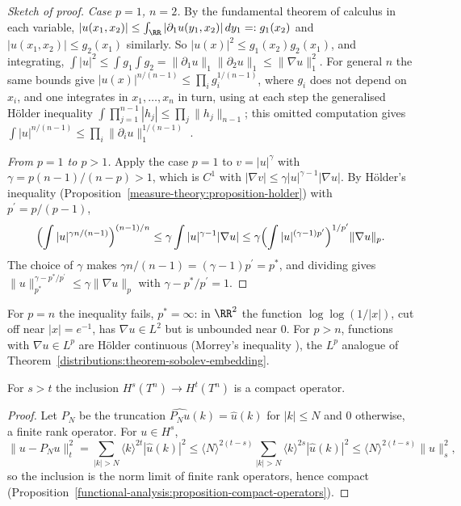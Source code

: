 \begin{proof}[Sketch of proof]
\emph{Case $p = 1$, $n = 2$.} By the fundamental theorem of calculus in each variable, $|u(x_1, x_2)| \leq \int_\RR|\partial_1u(y_1, x_2)|\,dy_1 =: g_1(x_2)$ and $|u(x_1, x_2)| \leq g_2(x_1)$ similarly. So
$|u(x)|^2 \leq g_1(x_2)g_2(x_1)$, and integrating, $\int|u|^2 \leq \int g_1\int g_2 = \|\partial_1u\|_1\|\partial_2u\|_1 \leq \|\nabla u\|_1^2$. For general $n$ the same bounds give
$|u(x)|^{n/(n-1)} \leq \prod_i g_i^{1/(n-1)}$, where $g_i$ does not depend on $x_i$, and one integrates in $x_1, \ldots, x_n$ in turn, using at each step the generalised H\"older inequality
$\int\prod_{j=1}^{n-1}|h_j| \leq \prod_j\|h_j\|_{n-1}$; this omitted computation gives $\int|u|^{n/(n-1)} \leq \prod_i\|\partial_iu\|_1^{1/(n-1)}$ \cite[Chapter 9]{brezis-functional}.

\emph{From $p = 1$ to $p > 1$.} Apply the case $p = 1$ to $v = |u|^\gamma$ with $\gamma = p(n - 1)/(n - p) > 1$, which is $C^1$ with $|\nabla v| \leq \gamma|u|^{\gamma - 1}|\nabla u|$. By H\"older's inequality
(Proposition~\ref{measure-theory:proposition-holder}) with $p^{\prime} = p/(p - 1)$,
\[
\Bigl(\int|u|^{\gamma n/(n-1)}\Bigr)^{(n-1)/n} \leq \gamma\int|u|^{\gamma - 1}|\nabla u| \leq \gamma\Bigl(\int|u|^{(\gamma - 1)p^{\prime}}\Bigr)^{1/p^{\prime}}\|\nabla u\|_p .
\]
The choice of $\gamma$ makes $\gamma n/(n - 1) = (\gamma - 1)p^{\prime} = p^*$, and dividing gives $\|u\|_{p^*}^{\gamma - p^*/p^{\prime}} \leq \gamma\|\nabla u\|_p$ with $\gamma - p^*/p^{\prime} = 1$.
\end{proof}

For $p = n$ the inequality fails, $p^* = \infty$: in $\RR^2$ the function $\log\log(1/|x|)$, cut off near $|x| = e^{-1}$, has $\nabla u \in L^2$ but is unbounded near $0$. For $p > n$, functions with
$\nabla u \in L^p$ are H\"older continuous (Morrey's inequality \cite[Chapter 9]{brezis-functional}), the $L^p$ analogue of Theorem~\ref{distributions:theorem-sobolev-embedding}.

\begin{theorem}[Rellich]\label{distributions:theorem-rellich}
For $s > t$ the inclusion $H^s(T^n) \to H^t(T^n)$ is a compact operator.
\end{theorem}

\begin{proof}
Let $P_N$ be the truncation $\widehat{P_Nu}(k) = \hat u(k)$ for $|k| \leq N$ and $0$ otherwise, a finite rank operator. For $u \in H^s$,
\[
\|u - P_Nu\|_t^2 = \sum_{|k| > N}\langle k\rangle^{2t}|\hat u(k)|^2 \leq \langle N\rangle^{2(t-s)}\sum_{|k| > N}\langle k\rangle^{2s}|\hat u(k)|^2 \leq \langle N\rangle^{2(t-s)}\|u\|_s^2,
\]
so the inclusion is the norm limit of finite rank operators, hence compact (Proposition~\ref{functional-analysis:proposition-compact-operators}).
\end{proof}

